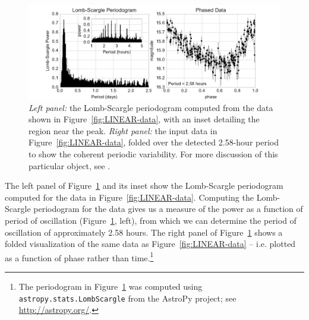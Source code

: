 \documentclass[preprint]{aastex}
\newcommand{\fig}[1]{Figure~\ref{fig:#1}}
\newcommand{\figlabel}[1]{\label{fig:#1}}
\begin{document}
\begin{figure}[ht]
\centering
\includegraphics[width=\textwidth]{fig02_LINEAR_PSD}
\caption{{\it Left panel:} the Lomb-Scargle periodogram computed from the data
    shown in \fig{LINEAR-data}, with an inset detailing the region near the peak.
    {\it Right panel:} the input data in \fig{LINEAR-data}, folded over the
    detected 2.58-hour period to show the coherent periodic variability.
    For more discussion of this particular object, see \citep{LINEAR3}.
    \figlabel{LINEAR-power}
}
\end{figure}

The left panel of \fig{LINEAR-power} and its inset show the Lomb-Scargle
periodogram computed for the data in \fig{LINEAR-data}.
Computing the Lomb-Scargle periodogram for the data gives us a measure of the
power as a function of period of oscillation (\fig{LINEAR-power}, left), from
which we can determine the period of oscillation of approximately 2.58 hours.
The right panel of \fig{LINEAR-power} shows a folded visualization of
the same data as \fig{LINEAR-data} -- i.e.{} plotted as a function of phase
rather than time.\footnote{
    The periodogram in \fig{LINEAR-power} was computed using
    {\tt astropy.stats.LombScargle}
    from the AstroPy project; see \url{http://astropy.org/}.
}
\end{document}
